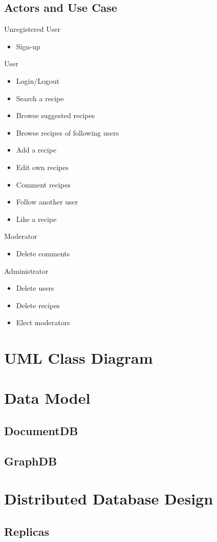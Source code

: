 \documentclass[a4paper]{report}
\begin{document}
\subsection{Actors and Use Case}
Unregistered User
\begin{itemize}
	\item Sign-up
\end{itemize}
User
\begin{itemize}
	\item Login/Logout
	\item Search a recipe
	\item Browse suggested recipes
	\item Browse recipes of following users
	\item Add a recipe
	\item Edit own recipes
	\item Comment recipes
	\item Follow another user
	\item Like a recipe
\end{itemize}
Moderator
\begin{itemize}
	\item Delete comments
\end{itemize}
Administrator
\begin{itemize}
	\item Delete users
	\item Delete recipes
	\item Elect moderators
\end{itemize}

\section{UML Class Diagram}
\section{Data Model}
\subsection{DocumentDB}
\subsection{GraphDB}
\section{Distributed Database Design}
\subsection{Replicas}
\end{document}
